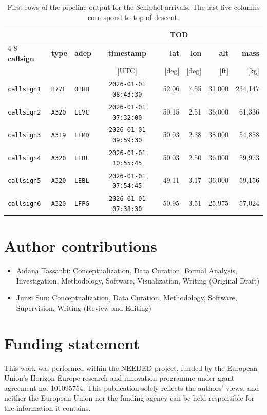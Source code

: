 \documentclass[
  manuscript=proceedings,  %
  layout=preprint,  %
  year=2026,
  volume=x,
]{extra/joas}
\begin{document}
\begin{table}[!ht]
    \centering
    \small
    \begin{tabular}{@{}lllcrrrr@{}}
    \toprule
    & & & \multicolumn{5}{c}{\textbf{TOD}} \\
    \cmidrule(lr){4-8}
    \textbf{callsign} & \textbf{type} & \textbf{adep} & \textbf{timestamp} & \textbf{lat} & \textbf{lon} & \textbf{alt} & \textbf{mass} \\
     & & & [UTC] & [deg] & [deg] & [ft] & [kg] \\
    \midrule
    \texttt{callsign1} & \texttt{B77L} & \texttt{OTHH} & \texttt{2026-01-01 08:43:30} & 52.06 & 7.55 & 31{,}000 & 234{,}147 \\
    \texttt{callsign2} & \texttt{A320} & \texttt{LEVC} & \texttt{2026-01-01 07:32:00} & 50.15 & 2.51 & 36{,}000 & 61{,}336 \\
    \texttt{callsign3} & \texttt{A319} & \texttt{LEMD} & \texttt{2026-01-01 09:59:30} & 50.03 & 2.38 & 38{,}000 & 54{,}858 \\
    \texttt{callsign4} & \texttt{A320} & \texttt{LEBL} & \texttt{2026-01-01 10:55:45} & 50.03 & 2.50 & 36{,}000 & 59{,}973 \\
    \texttt{callsign5} & \texttt{A320} & \texttt{LEBL} & \texttt{2026-01-01 07:54:45} & 49.11 & 3.17 & 36{,}000 & 59{,}156 \\
    \texttt{callsign6} & \texttt{A320} & \texttt{LFPG} & \texttt{2026-01-01 07:38:30} & 50.95 & 3.51 & 25{,}975 & 57{,}024 \\
    \bottomrule
    \end{tabular}
    \caption{First rows of the pipeline output for the Schiphol arrivals. The last five columns correspond to top of descent.}
    \label{tab:sample}
\end{table}


\section*{Author contributions}
\begin{itemize}
  \item Aidana Tassanbi: Conceptualization, Data Curation, Formal Analysis, Investigation, Methodology, Software, Visualization, Writing (Original Draft)
  \item Junzi Sun: Conceptualization, Data Curation, Methodology, Software, Supervision, Writing (Review and Editing)
\end{itemize}

\section*{Funding statement}
This work was performed within the NEEDED project, funded by the European Union’s Horizon Europe research and innovation programme under grant agreement no. 101095754. This publication solely reflects the authors’ views, and neither the European Union nor the funding agency can be held responsible for the information it contains.
\end{document}
